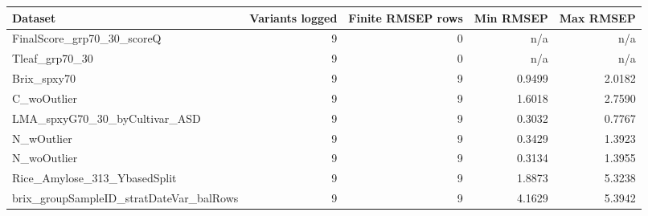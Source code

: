 \begin{tabularx}{\linewidth}{Xrrrr}
\toprule
Dataset & Variants logged & Finite RMSEP rows & Min RMSEP & Max RMSEP \\
\midrule
FinalScore\_\allowbreak{}grp70\_\allowbreak{}30\_\allowbreak{}scoreQ & 9 & 0 & n/a & n/a \\
Tleaf\_\allowbreak{}grp70\_\allowbreak{}30 & 9 & 0 & n/a & n/a \\
Brix\_\allowbreak{}spxy70 & 9 & 9 & 0.9499 & 2.0182 \\
C\_\allowbreak{}woOutlier & 9 & 9 & 1.6018 & 2.7590 \\
LMA\_\allowbreak{}spxyG70\_\allowbreak{}30\_\allowbreak{}byCultivar\_\allowbreak{}ASD & 9 & 9 & 0.3032 & 0.7767 \\
N\_\allowbreak{}wOutlier & 9 & 9 & 0.3429 & 1.3923 \\
N\_\allowbreak{}woOutlier & 9 & 9 & 0.3134 & 1.3955 \\
Rice\_\allowbreak{}Amylose\_\allowbreak{}313\_\allowbreak{}YbasedSplit & 9 & 9 & 1.8873 & 5.3238 \\
brix\_\allowbreak{}groupSampleID\_\allowbreak{}stratDateVar\_\allowbreak{}balRows & 9 & 9 & 4.1629 & 5.3942 \\
\bottomrule
\end{tabularx}
